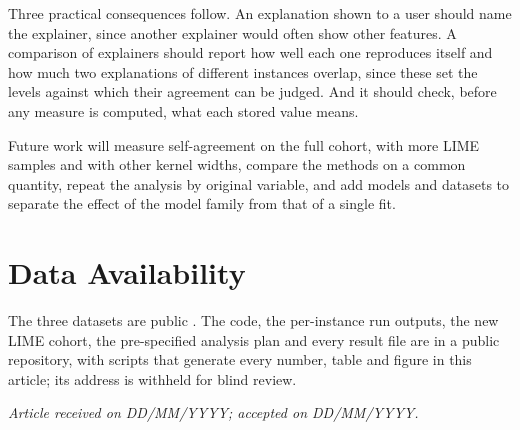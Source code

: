 \documentclass{cys}
\newif\iffull
\begin{document}
Three practical consequences follow. An explanation shown to a user should name the
explainer, since another explainer would often show other features. A comparison of
explainers should report how well each one reproduces itself and how much two explanations
of different instances overlap, since these set the levels against which their agreement
can be judged. And it should check, before any measure
is computed, what each stored value means.

Future work will measure self-agreement on the full cohort, with more LIME samples and
with other kernel widths,
compare the methods on a common quantity, repeat the analysis by original variable, and
add models and datasets to separate the effect of the model family from that of a single
fit.

\section*{Data Availability}
\iffull
The three datasets are public
\cite{becker1996adult,hofmann1994statlog,wolberg1993breast}. The code, the per-instance
run outputs, the new LIME cohort, the pre-specified analysis plan and every result file are
available at \url{https://github.com/jonnabio/xai-eval-framework} (release
\texttt{\papererelease}), archived at \paperearchive. Every number, table
and figure in this article is generated from those files by the scripts described in
\texttt{docs/reports/paper\_e/README.md}.
\else
The three datasets are public
\cite{becker1996adult,hofmann1994statlog,wolberg1993breast}. The code, the per-instance
run outputs, the new LIME cohort, the pre-specified analysis plan and every result file are
in a public repository, with scripts that generate every number, table and figure in
this article; its address is withheld for blind review.
\fi

\let\fullurl\url
{
\renewcommand{\url}[1]{\href{https://doi.org/#1}{\nolinkurl{#1}}}


}

{\vskip 12pt}
\noindent
\footnotesize {\textit{Article received on DD/MM/YYYY; accepted on DD/MM/YYYY.\iffull\\
{*}Corresponding author is Jonathan Herrera-V\'asquez.\fi}}
\end{document}
